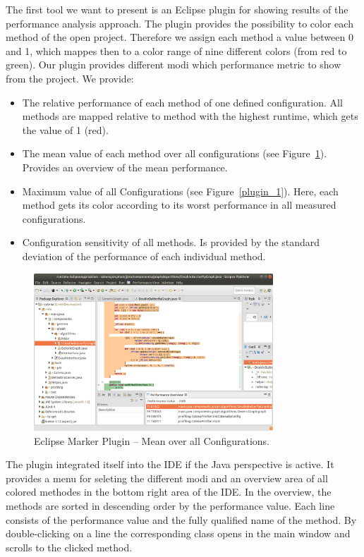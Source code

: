 The first tool we want to present is an Eclipse plugin for showing results of the performance analysis approach. The plugin provides the possibility to color each method of the open project. Therefore we assign each method a value between 0 and 1, which mappes then to a color range of nine different colors (from red to green). Our plugin provides different modi which performance metric to show from the project. We provide:
\begin{itemize}
	\item The relative performance of each method of one defined configuration. All methods are mapped relative to method with the highest runtime, which gets the value of 1 (red).
	\item The mean value of each method over all configurations (see Figure~\ref{plugin_2}). Provides an overview of the mean performance.
	\item Maximum value of all Configurations (see Figure~\ref{plugin_1}). Here, each method gets its color according to its worst performance in all measured configurations.
	\item Configuration sensitivity of all methods. Is provided by the standard deviation of the performance of each individual method.
\end{itemize}


\begin{figure}[h]
  \centering
  \includegraphics[width=0.8\textwidth]{images/eclipse2}
  \caption{Eclipse Marker Plugin -- Mean over all Configurations.}
  \label{plugin_2}
\end{figure}


The plugin integrated itself into the IDE if the Java perspective is active. It provides a menu for seleting the different modi and an overview area of all colored methodes in the bottom right area of the IDE. In the overview, the methods are sorted in descending order by the performance value. Each line consists of the performance value and the fully qualified name of the method. By double-clicking on a line the corresponding class opens in the main window and scrolls to the clicked method. 



